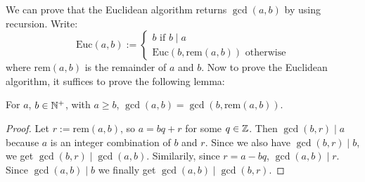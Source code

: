 We can prove that the Euclidean algorithm returns $\gcd(a,b)$ by using recursion. Write:
\[ \text{Euc}(a,b) := \begin{cases} b \text{ if } b \mid a \\ \text{Euc}(b, \text{rem}(a,b)) \text{ otherwise}
\end{cases}\]
where $\text{rem}(a,b)$ is the remainder of $a$ and $b$. Now to prove the Euclidean algorithm, it suffices to prove the following lemma:

\begin{lemmabox}
   For $a$, $b \in \mathbb{N}^+$, with $a \geq b$, $\gcd(a,b) = \gcd(b, \text{rem}(a,b))$. 
\end{lemmabox}
\begin{proof}
   Let $r := \text{rem}(a,b)$, so $a = bq + r$ for some $q \in \mathbb{Z}$. Then $\gcd(b,r) \mid a$ because $a$ is an integer combination of $b$ and $r$. Since we also have $\gcd(b,r) \mid b$, we get $\gcd(b, r) \mid \gcd(a, b)$. Similarily, since $r = a - bq$, $\gcd(a,b) \mid r$. Since $\gcd(a,b) \mid b$ we finally get $\gcd(a,b) \mid \gcd(b,r)$.  
\end{proof}
